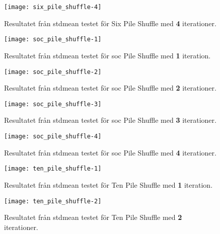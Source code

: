 \begin{figure}[H]
	\centering
	\texttt{[image: six\_pile\_shuffle-4]} 
	\captionsetup{width=0.5\textwidth}
	\caption{Resultatet från \gls{stdmean} testet för Six Pile
	Shuffle med \textbf{4} iterationer.}
	\label{fig:six-4}
\end{figure}

\begin{figure}[H]
	\centering
	\texttt{[image: soc\_pile\_shuffle-1]} 
	\captionsetup{width=0.5\textwidth}
	\caption{Resultatet från \gls{stdmean} testet för \gls{soc} Pile
	Shuffle med \textbf{1} iteration.}
	\label{fig:soc-1}
\end{figure}

\begin{figure}[H]
	\centering
	\texttt{[image: soc\_pile\_shuffle-2]} 
	\captionsetup{width=0.5\textwidth}
	\caption{Resultatet från \gls{stdmean} testet för \gls{soc} Pile
	Shuffle med \textbf{2} iterationer.}
	\label{fig:soc-2}
\end{figure}

\begin{figure}[H]
	\centering
	\texttt{[image: soc\_pile\_shuffle-3]} 
	\captionsetup{width=0.5\textwidth}
	\caption{Resultatet från \gls{stdmean} testet för \gls{soc} Pile
	Shuffle med \textbf{3} iterationer.}
	\label{fig:soc-3}
\end{figure}

\begin{figure}[H]
	\centering
	\texttt{[image: soc\_pile\_shuffle-4]} 
	\captionsetup{width=0.5\textwidth}
	\caption{Resultatet från \gls{stdmean} testet för \gls{soc} Pile
	Shuffle med \textbf{4} iterationer.}
	\label{fig:soc-4}
\end{figure}

\begin{figure}[H]
	\centering
	\texttt{[image: ten\_pile\_shuffle-1]} 
	\captionsetup{width=0.5\textwidth}
	\caption{Resultatet från \gls{stdmean} testet för Ten Pile
	Shuffle med \textbf{1} iteration.}
	\label{fig:ten-1}
\end{figure}

\begin{figure}[H]
	\centering
	\texttt{[image: ten\_pile\_shuffle-2]} 
	\captionsetup{width=0.5\textwidth}
	\caption{Resultatet från \gls{stdmean} testet för Ten Pile
	Shuffle med \textbf{2} iterationer.}
	\label{fig:ten-2}
\end{figure}

